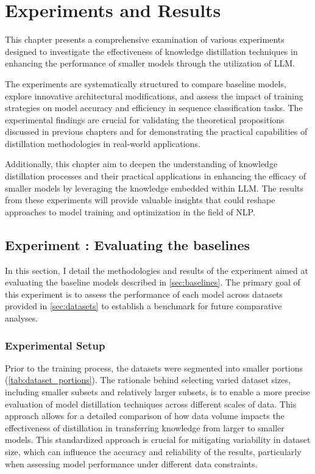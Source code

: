 \chapter{Experiments and Results}
\label{chap:impl}

This chapter presents a comprehensive examination of various experiments designed to investigate the effectiveness of knowledge distillation techniques in enhancing the performance of smaller models through the utilization of LLM\@.

The experiments are systematically structured to compare baseline models, explore innovative architectural modifications, and assess the impact of training strategies on model accuracy and efficiency in sequence classification tasks. The experimental findings are crucial for validating the theoretical propositions discussed in previous chapters and for demonstrating the practical capabilities of distillation methodologies in real-world applications.

Additionally, this chapter aim to deepen the understanding of knowledge distillation processes and their practical applications in enhancing the efficacy of smaller models by leveraging the knowledge embedded within LLM\@. The results from these experiments will provide valuable insights that could reshape approaches to model training and optimization in the field of NLP\@.

\section{Experiment \theexperiment: Evaluating the baselines}

In this section, I detail the methodologies and results of the experiment aimed at evaluating the baseline models described in \autoref{sec:baselines}. The primary goal of this experiment is to assess the performance of each model across datasets provided in \autoref{sec:datasets} to establish a benchmark for future comparative analyses.

\subsection*{Experimental Setup}

Prior to the training process, the datasets were segmented into smaller portions (\autoref{tab:dataset_portions}). The rationale behind selecting varied dataset sizes, including smaller subsets and relatively larger subsets, is to enable a more precise evaluation of model distillation techniques across different scales of data. This approach allows for a detailed comparison of how data volume impacts the effectiveness of distillation in transferring knowledge from larger to smaller models. This standardized approach is crucial for mitigating variability in dataset size, which can influence the accuracy and reliability of the results, particularly when assessing model performance under different data constraints.

